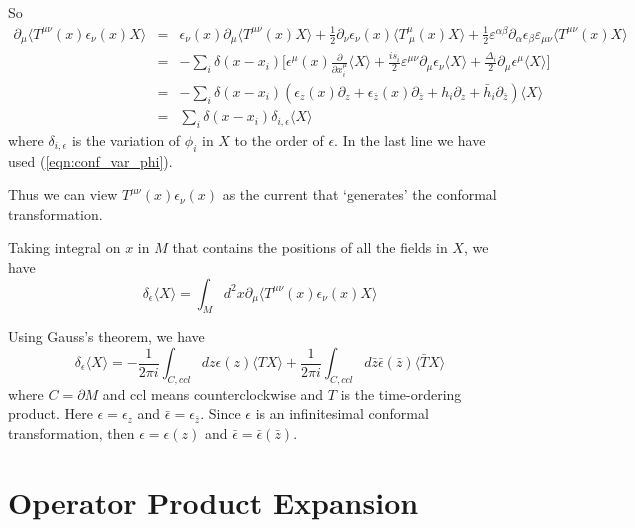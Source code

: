 \documentclass[12pt]{book}
\begin{document}
	So
	\begin{eqnarray}
		\partial_\mu\langle T^{\mu\nu}(x)\epsilon_\nu(x)X\rangle &=& \epsilon_\nu(x)\partial_\mu\langle  T^{\mu\nu}(x)X\rangle +\frac 12 \partial_\nu\epsilon_\nu(x)\langle T^\mu_{\ \mu}(x)X\rangle+\frac 12 \varepsilon^{\alpha\beta}\partial_\alpha\epsilon_\beta\varepsilon_{\mu\nu}\langle T^{\mu\nu}(x)X\rangle\\
		&=&-\sum_i\delta(x-x_i)\Big[ \epsilon^\mu(x)\frac{\partial}{\partial x_i^{\mu}} \langle X\rangle+\frac {is_i}2 \varepsilon^{\mu\nu}\partial_\mu\epsilon_\nu\langle X\rangle+\frac {\Delta_i}2 \partial_\mu\epsilon^\mu\langle X\rangle\Big]\\
		&=&-\sum_i\delta(x-x_i)(\epsilon_z(x)\partial_z+\epsilon_{\bar z}(x)\partial_{\bar z}+h_i\partial_z+\bar h_i\partial_{\bar z})\langle X\rangle\\
		&=&\sum_i\delta(x-x_i)\delta_{i,\epsilon}\langle X\rangle \label{eqn:cft_ward}
	\end{eqnarray}
	where $\delta_{i,\epsilon}$ is the variation of $\phi_i$ in $X$ to the order of $\epsilon$. In the last line we have used (\ref{eqn:conf_var_phi}). 
	
	Thus we can view $ T^{\mu\nu}(x)\epsilon_\nu(x)$ as the current that `generates' the conformal transformation.
	
	Taking integral on $x$ in $M$ that contains the positions of all the fields in $X$, we have
	\begin{equation}
		\delta_{\epsilon}\langle X\rangle=\int_M d^2x \partial_\mu\langle T^{\mu\nu}(x)\epsilon_\nu(x)X\rangle
	\end{equation}
	
	Using Gauss's theorem, we have
	\begin{equation}
		\delta_{\epsilon}\langle X\rangle=-\frac 1{2\pi i}\int_{C,ccl} dz \epsilon(z)\langle TX\rangle + \frac 1{2\pi i}\int_{C,ccl} d \bar z \bar\epsilon(\bar z)\langle \bar TX\rangle
	\end{equation}
	where $C=\partial M$ and ccl means counterclockwise and $T$ is the time-ordering product. Here $\epsilon =\epsilon_z$ and $\bar\epsilon=\epsilon_{\bar z}$. Since $\epsilon$ is an infinitesimal conformal transformation, then $\epsilon=\epsilon(z)$ and $\bar\epsilon=\bar\epsilon(\bar z)$.
	
	\section{Operator Product Expansion}
	
\end{document}
